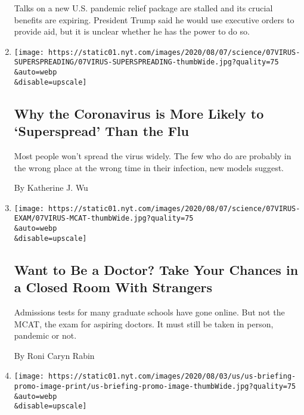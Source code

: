 \begin{enumerate}
  Talks on a new U.S. pandemic relief package are stalled and its
  crucial benefits are expiring. President Trump said he would use
  executive orders to provide aid, but it is unclear whether he has the
  power to do so.
\item
  \href{/2020/08/07/health/coronavirus-superspreading-contagion.html}{}

  \texttt{[image: https://static01.nyt.com/images/2020/08/07/science/07VIRUS-SUPERSPREADING/07VIRUS-SUPERSPREADING-thumbWide.jpg?quality=75\\\&auto=webp\\\&disable=upscale]}

  \hypertarget{why-the-coronavirus-is-more-likely-to-superspread-than-the-flu}{%
  \subsection{Why the Coronavirus is More Likely to `Superspread' Than
  the
  Flu}\label{why-the-coronavirus-is-more-likely-to-superspread-than-the-flu}}

  Most people won't spread the virus widely. The few who do are probably
  in the wrong place at the wrong time in their infection, new models
  suggest.

  By Katherine J. Wu
\item
  \href{/2020/08/07/health/coronavirus-exams-mcat.html}{}

  \texttt{[image: https://static01.nyt.com/images/2020/08/07/science/07VIRUS-EXAM/07VIRUS-MCAT-thumbWide.jpg?quality=75\\\&auto=webp\\\&disable=upscale]}

  \hypertarget{want-to-be-a-doctor-take-your-chances-in-a-closed-room-with-strangers}{%
  \subsection{Want to Be a Doctor? Take Your Chances in a Closed Room
  With
  Strangers}\label{want-to-be-a-doctor-take-your-chances-in-a-closed-room-with-strangers}}

  Admissions tests for many graduate schools have gone online. But not
  the MCAT, the exam for aspiring doctors. It must still be taken in
  person, pandemic or not.

  By Roni Caryn Rabin
\item
  \href{/2020/08/07/world/covid-19-news.html}{}

  \texttt{[image: https://static01.nyt.com/images/2020/08/03/us/us-briefing-promo-image-print/us-briefing-promo-image-thumbWide.jpg?quality=75\\\&auto=webp\\\&disable=upscale]}


\end{enumerate}

